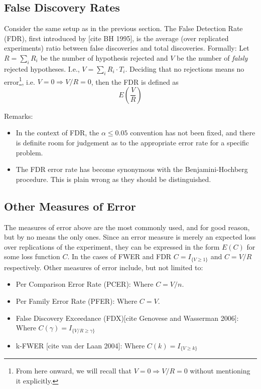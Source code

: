 \documentclass[draft,12pt]{article}
\begin{document}
\subsection{False Discovery Rates}
Consider the same setup as in the previous section. The False Detection Rate (FDR), first introduced by [cite BH 1995], is the average (over replicated experiments) ratio between false discoveries and total discoveries.
Formally: Let $R=\sum_i{R_i}$ be the number of hypothesis rejected and $V$ be the number of \emph{falsly} rejected hypotheses. I.e., $V=\sum_i{R_i \cdot T_i}$. Deciding that no rejections means no error\footnote{ From here onward, we will recall that $V=0 \Rightarrow V/R=0$ without mentioning it explicitly.}, i.e.  $V=0 \Rightarrow V/R=0$, then the FDR is defined as $$E \left( \frac{V}{R} \right)$$

Remarks:
\begin{itemize}
\item In the context of FDR, the $\alpha \leq 0.05$ convention has not been fixed, and there is definite room for judgement as to the appropriate error rate for a specific problem.
\item The FDR error rate has become synonymous with the Benjamini-Hochberg procedure. This is plain wrong as they should be distinguished.
\end{itemize}




\subsection{Other Measures of Error}
The measures of error above are the most commonly used, and for good reason, but by no means the only ones. Since an error measure is merely an expected loss over replications of the experiment, they can be expressed in the form $E(C)$ for some loss function $C$. In the cases of FWER and FDR $C = I_{\{ V \geq 1 \} } $ and $C = V/R$ respectively.
Other measures of error include, but not limited to:

\begin{itemize}
\item Per Comparison Error Rate (PCER): Where $C=V/n$.
\item Per Family Error Rate (PFER): Where $C=V$.
\item False Discovery Exceedance (FDX)[cite Genovese and Wasserman 2006]: Where $C(\gamma) = I_{\{ V/R \geq \gamma \} }$
\item k-FWER [cite van der Laan 2004]: Where $C(k) = I_{\{ V \geq k \} }$
\end{itemize}
\end{document}
